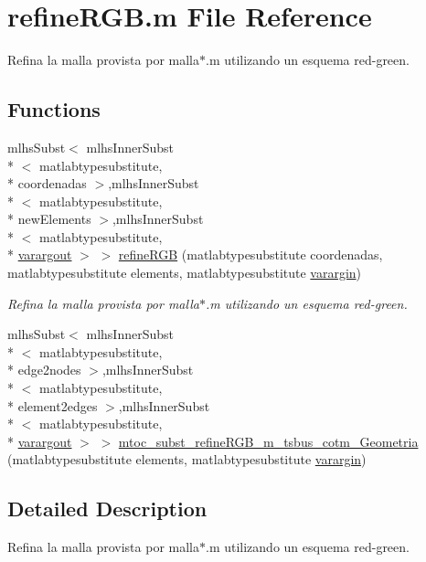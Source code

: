 \hypertarget{a00029}{\section{refine\-R\-G\-B.\-m File Reference}
\label{a00029}
}


Refina la malla provista por malla$\ast$.m utilizando un esquema red-\/green.  


\subsection*{Functions}
\begin{DoxyCompactItemize}
\item 
mlhs\-Subst$<$ mlhs\-Inner\-Subst\\*
$<$ matlabtypesubstitute, \\*
coordenadas $>$,mlhs\-Inner\-Subst\\*
$<$ matlabtypesubstitute, \\*
new\-Elements $>$,mlhs\-Inner\-Subst\\*
$<$ matlabtypesubstitute, \\*
\hyperlink{a00015}{varargout} $>$ $>$ \hyperlink{a00029_af36e1519bec7348bc4c928967c93800d}{refine\-R\-G\-B} (matlabtypesubstitute coordenadas, matlabtypesubstitute elements, matlabtypesubstitute \hyperlink{a00014}{varargin})
\begin{DoxyCompactList}\small\item\em Refina la malla provista por malla$\ast$.m utilizando un esquema red-\/green. \end{DoxyCompactList}\item 
mlhs\-Subst$<$ mlhs\-Inner\-Subst\\*
$<$ matlabtypesubstitute, \\*
edge2nodes $>$,mlhs\-Inner\-Subst\\*
$<$ matlabtypesubstitute, \\*
element2edges $>$,mlhs\-Inner\-Subst\\*
$<$ matlabtypesubstitute, \\*
\hyperlink{a00015}{varargout} $>$ $>$ \hyperlink{a00029_ab13f3537346ad3e10bb5f966d70ab360}{mtoc\-\_\-subst\-\_\-refine\-R\-G\-B\-\_\-m\-\_\-tsbus\-\_\-cotm\-\_\-\-Geometria} (matlabtypesubstitute elements, matlabtypesubstitute \hyperlink{a00014}{varargin})
\end{DoxyCompactItemize}


\subsection{Detailed Description}
Refina la malla provista por malla$\ast$.m utilizando un esquema red-\/green. 

